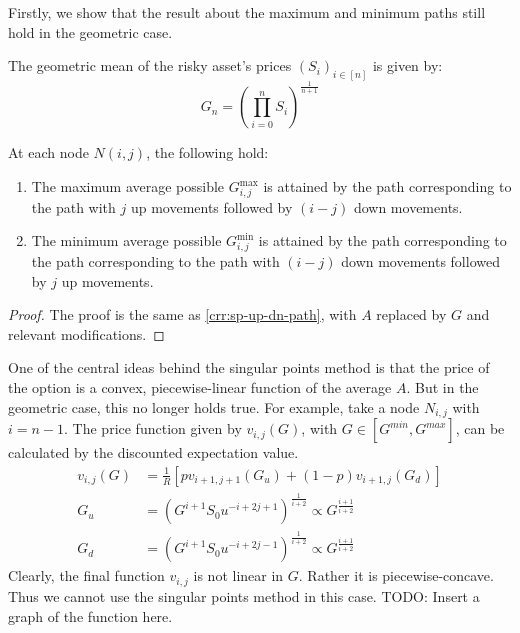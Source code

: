 Firstly, we show that the result about the maximum and minimum paths still hold in the geometric case.

\begin{dfn}
	The geometric mean of the risky asset's prices $ (S_i)_{i \in [n]} $ is given by:
	\begin{equation}
		\label{eq:gm}
		G_{n} = \left( \prod_{i=0}^n S_i \right) ^{\frac{1}{n+1}}
	\end{equation}
\end{dfn}


\begin{lmm}
	At each node $N(i,j)$, the following hold:
	\begin{enumerate}
	\item The maximum average possible $ G_{i,j}^{\max} $ is attained by the path corresponding to the path with $j$ up movements followed by $(i-j)$ down movements.
	\item The minimum average possible $ G_{i,j}^{\min} $ is attained by the path corresponding to the path corresponding to the path with $(i-j)$ down movements followed by $j$ up movements.
	\end{enumerate}
\end{lmm}

\begin{proof}
	The proof is the same as \ref{crr:sp-up-dn-path}, with $A$ replaced by $G$ and relevant modifications.
\end{proof}


One of the central ideas behind the singular points method is that the price of the option is a convex, piecewise-linear function of the average $A$. But in the geometric case, this no longer holds true. For example, take a node $N_{i,j}$ with $ i = n-1 $. The price function given by $ v_{i,j}(G) $, with $ G \in [G^{min},G^{max}] $, can be calculated by the discounted expectation value.
\begin{align}
	v_{i,j}(G) &= \frac{1}{R} \left[ p v_{i+1,j+1}(G_u) + (1-p) v_{i+1,j}(G_d) \right] \\
	G_u &= \left( G^{i+1} S_0 u^{-i+2j+1} \right)^{\frac{1}{i+2}} \propto G^{\frac{i+1}{i+2}} \\
	G_d &= \left( G^{i+1} S_0 u^{-i+2j-1} \right)^{\frac{1}{i+2}} \propto G^{\frac{i+1}{i+2}}
\end{align}
Clearly, the final function $ v_{i,j} $ is not linear in $G$. Rather it is piecewise-concave. Thus we cannot use the singular points method in this case.
TODO: Insert a graph of the function here.



